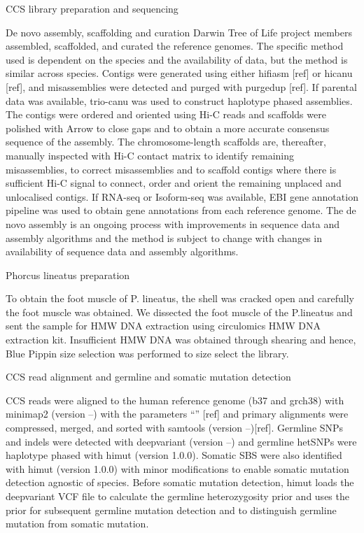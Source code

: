 CCS library preparation and sequencing

De novo assembly, scaffolding and curation
Darwin Tree of Life project members assembled, scaffolded, and curated the reference genomes. The specific method used is dependent on the species and the availability of data, but the method is similar across species. Contigs were generated using either hifiasm [ref] or hicanu [ref], and misassemblies were detected and purged with purgedup [ref]. If parental data was available, trio-canu was used to construct haplotype phased assemblies. The contigs were ordered and oriented using Hi-C reads and scaffolds were polished with Arrow to close gaps and to obtain a more accurate consensus sequence of the assembly. The chromosome-length scaffolds are, thereafter, manually inspected with Hi-C contact matrix to identify remaining misassemblies, to correct misassemblies and to scaffold contigs where there is sufficient Hi-C signal to connect, order and orient the remaining unplaced and unlocalised contigs. If RNA-seq or Isoform-seq was available, EBI gene annotation pipeline was used to obtain gene annotations from each reference genome. The de novo assembly is an ongoing process with improvements in sequence data and assembly algorithms and the method is subject to change with changes in availability of sequence data and assembly algorithms.

Phorcus lineatus preparation 


To obtain the foot muscle of P. lineatus, the shell was cracked open and carefully the foot muscle was obtained. We dissected the foot muscle of the P.lineatus and sent the sample for HMW DNA extraction using circulomics HMW DNA extraction kit. Insufficient HMW DNA was obtained through shearing and hence, Blue Pippin size selection was performed to size select the library.


CCS read alignment and germline and somatic mutation detection

CCS reads were aligned to the human reference genome (b37 and grch38) with minimap2 (version --) with the parameters “” [ref] and primary alignments were compressed, merged, and sorted with samtools (version --)[ref]. Germline SNPs and indels were detected with deepvariant (version --) and germline hetSNPs were haplotype phased with himut (version 1.0.0). Somatic SBS were also identified with himut (version 1.0.0) with minor modifications to enable somatic mutation detection agnostic of species. Before somatic mutation detection, himut loads the deepvariant VCF file to calculate the germline heterozygosity prior and uses the prior for subsequent germline mutation detection and to distinguish germline mutation from somatic mutation.
 
